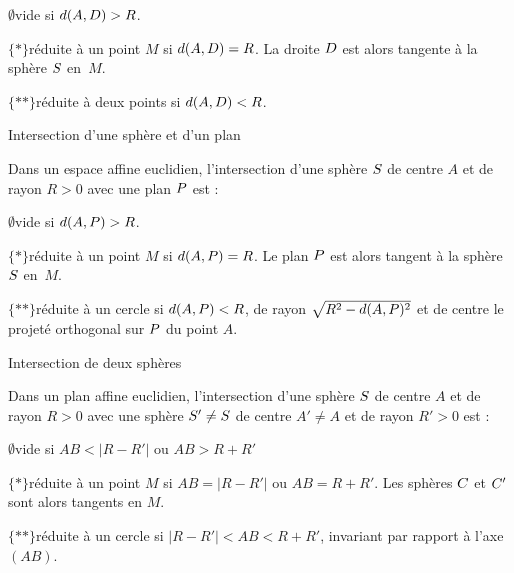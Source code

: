 \noindent
\item{$\emptyset$}vide si $d(A,\sc D)>R$. 
\medskip

\noindent
\item{$\{*\}$}réduite à un point $M$ si $d(A,\sc D)=R$. La droite $\sc D$ est alors tangente à la sphère $\sc S$ en~$M$. 
\medskip

\noindent
\item{$\{**\}$}réduite à deux points si $d(A,\sc D)<R$. 
\medskip


\Concept [] Intersection d'une sphère et d'un plan

\noindent
Dans un espace affine euclidien, l'intersection d'une sphère $\sc S$ de centre $A$ et de rayon $R>0$ avec une plan $\sc P$ est :
\medskip

\noindent
\item{$\emptyset$}vide si $d(A,\sc P)>R$. 
\medskip

\noindent
\item{$\{*\}$}réduite à un point $M$ si $d(A,\sc P)=R$. Le plan $\sc P$ est alors tangent à la sphère $\sc S$ en~$M$. 
\medskip

\noindent
\item{$\{**\}$}réduite à un cercle si $d(A,\sc P)<R$, de rayon $\sqrt{R^2-d(A,\sc P)^2}$ et de centre le projeté orthogonal sur $\sc P$ du point $A$. 
\medskip

\Concept [] Intersection de deux sphères

\noindent
Dans un plan affine euclidien, l'intersection d'une sphère $\sc S$ de centre $A$ et de rayon $R>0$ avec une sphère $\sc S'\neq\sc S$ de centre $A'\neq A$ et de rayon $R'>0$ est :
\medskip
\noindent
\item{$\emptyset$}vide si $AB<|R-R'|$ ou $AB>R+R'$
\medskip
\noindent
\item{$\{*\}$}réduite à un point $M$ si $AB=|R-R'|$ ou $AB=R+R'$. Les sphères $\sc C$ et $\sc C'$ sont alors tangents en $M$. 
\medskip
\noindent
\item{$\{**\}$}réduite à un cercle si $|R-R'|<AB<R+R'$, invariant par rapport à l'axe $(AB)$. 

















                  


